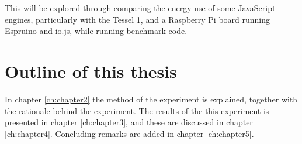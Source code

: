 This will be explored through comparing the energy use of some JavaScript engines, particularly with the Tessel 1, and a Raspberry Pi board running Espruino and io.js, while running benchmark code.

\section{Outline of this thesis}
In chapter \ref{ch:chapter2} the method of the experiment is explained, together with the rationale behind the experiment.
The results of the this experiment is presented in chapter \ref{ch:chapter3}, and these are discussed in chapter \ref{ch:chapter4}.
Concluding remarks are added in chapter \ref{ch:chapter5}.